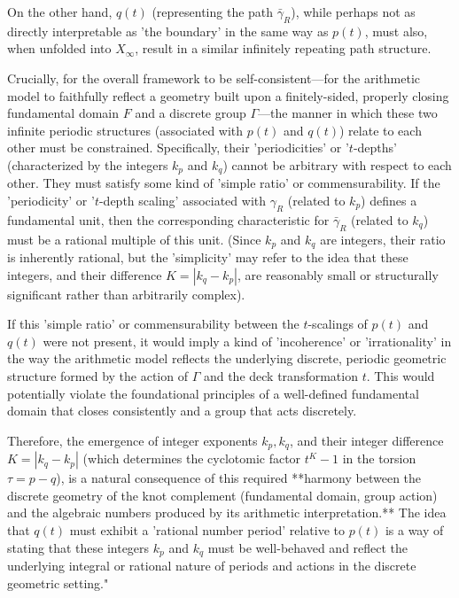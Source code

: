 \documentclass{article}[a4paper,12pt]
\begin{document}
On the other hand, $q(t)$ (representing the path $\bar{\gamma}_R$), while perhaps not as directly interpretable as 'the boundary' in the same way as $p(t)$, must also, when unfolded into $X_\infty$, result in a similar infinitely repeating path structure.

Crucially, for the overall framework to be self-consistent—for the arithmetic model to faithfully reflect a geometry built upon a finitely-sided, properly closing fundamental domain $F$ and a discrete group $\Gamma$—the manner in which these two infinite periodic structures (associated with $p(t)$ and $q(t)$) relate to each other must be constrained. Specifically, their 'periodicities' or '$t$-depths' (characterized by the integers $k_p$ and $k_q$) cannot be arbitrary with respect to each other. They must satisfy some kind of 'simple ratio' or commensurability. If the 'periodicity' or '$t$-depth scaling' associated with $\gamma_R$ (related to $k_p$) defines a fundamental unit, then the corresponding characteristic for $\bar{\gamma}_R$ (related to $k_q$) must be a rational multiple of this unit. (Since $k_p$ and $k_q$ are integers, their ratio is inherently rational, but the 'simplicity' may refer to the idea that these integers, and their difference $K = |k_q-k_p|$, are reasonably small or structurally significant rather than arbitrarily complex).

If this 'simple ratio' or commensurability between the $t$-scalings of $p(t)$ and $q(t)$ were not present, it would imply a kind of 'incoherence' or 'irrationality' in the way the arithmetic model reflects the underlying discrete, periodic geometric structure formed by the action of $\Gamma$ and the deck transformation $t$. This would potentially violate the foundational principles of a well-defined fundamental domain that closes consistently and a group that acts discretely.

Therefore, the emergence of integer exponents $k_p, k_q$, and their integer difference $K = |k_q-k_p|$ (which determines the cyclotomic factor $t^K-1$ in the torsion $\tau = p-q$), is a natural consequence of this required **harmony between the discrete geometry of the knot complement (fundamental domain, group action) and the algebraic numbers produced by its arithmetic interpretation.** The idea that $q(t)$ must exhibit a 'rational number period' relative to $p(t)$ is a way of stating that these integers $k_p$ and $k_q$ must be well-behaved and reflect the underlying integral or rational nature of periods and actions in the discrete geometric setting."
\end{document}
